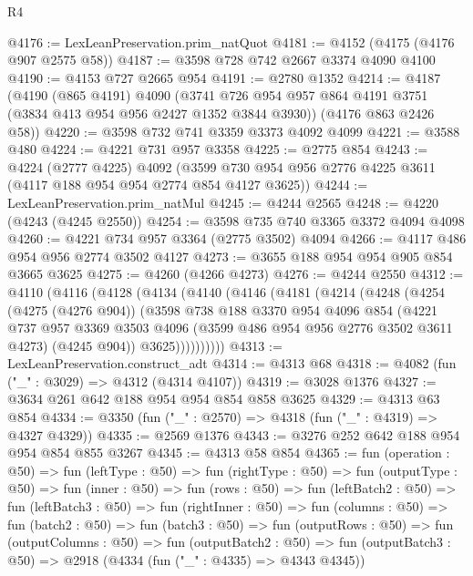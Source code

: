 \begin{lexlean}{R4}
\begin{coremodule}
@4176 := LexLeanPreservation.prim_natQuot
@4181 := @4152 (@4175 (@4176 @907 @2575 @58))
@4187 := @3598 @728 @742 @2667 @3374 @4090 @4100
@4190 := @4153 @727 @2665 @954
@4191 := @2780 @1352
@4214 := @4187
    (@4190
      (@865 @4191)
      @4090
      (@3741 @726 @954 @957 @864 @4191 @3751 (@3834 @413 @954 @956 @2427 @1352 @3844 @3930))
      (@4176 @863 @2426 @58))
@4220 := @3598 @732 @741 @3359 @3373 @4092 @4099
@4221 := @3588 @480
@4224 := @4221 @731 @957 @3358
@4225 := @2775 @854
@4243 := @4224
    (@2777 @4225)
    @4092
    (@3599 @730 @954 @956 @2776 @4225 @3611 (@4117 @188 @954 @954 @2774 @854 @4127 @3625))
@4244 := LexLeanPreservation.prim_natMul
@4245 := @4244 @2565
@4248 := @4220 (@4243 (@4245 @2550))
@4254 := @3598 @735 @740 @3365 @3372 @4094 @4098
@4260 := @4221 @734 @957 @3364 (@2775 @3502) @4094
@4266 := @4117 @486 @954 @956 @2774 @3502 @4127
@4273 := @3655 @188 @954 @954 @905 @854 @3665 @3625
@4275 := @4260 (@4266 @4273)
@4276 := @4244 @2550
@4312 := @4110
    (@4116
      (@4128
        (@4134
          (@4140
            (@4146
              (@4181
                (@4214
                  (@4248
                    (@4254
                      (@4275 (@4276 @904))
                      (@3598
                        @738
                        @188
                        @3370
                        @954
                        @4096
                        @854
                        (@4221
                          @737
                          @957
                          @3369
                          @3503
                          @4096
                          (@3599 @486 @954 @956 @2776 @3502 @3611 @4273)
                          (@4245 @904))
                        @3625))))))))))
@4313 := LexLeanPreservation.construct_adt
@4314 := @4313 @68
@4318 := @4082 (fun ("_" : @3029) => @4312 (@4314 @4107))
@4319 := @3028 @1376
@4327 := @3634 @261 @642 @188 @954 @954 @854 @858 @3625
@4329 := @4313 @63 @854
@4334 := @3350 (fun ("_" : @2570) => @4318 (fun ("_" : @4319) => @4327 @4329))
@4335 := @2569 @1376
@4343 := @3276 @252 @642 @188 @954 @954 @854 @855 @3267
@4345 := @4313 @58 @854
@4365 := fun (operation : @50) =>
  fun (leftType : @50) =>
  fun (rightType : @50) =>
  fun (outputType : @50) =>
  fun (inner : @50) =>
  fun (rows : @50) =>
  fun (leftBatch2 : @50) =>
  fun (leftBatch3 : @50) =>
  fun (rightInner : @50) =>
  fun (columns : @50) =>
  fun (batch2 : @50) =>
  fun (batch3 : @50) =>
  fun (outputRows : @50) =>
  fun (outputColumns : @50) =>
  fun (outputBatch2 : @50) =>
  fun (outputBatch3 : @50) => @2918 (@4334 (fun ("_" : @4335) => @4343 @4345))

\end{coremodule}
\end{lexlean}
